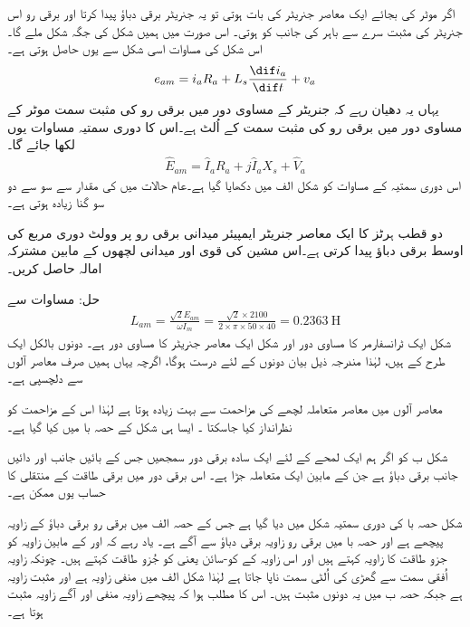اگر موٹر کی بجائے ایک معاصر جنریٹر کی بات ہوتی تو یہ جنریٹر برقی دباؤ پیدا کرتا اور برقی رو اس جنریٹر کی مثبت سرے سے باہر کی جانب کو ہوتی۔ اس صورت میں ہمیں شکل  کی جگہ شکل  ملے گا۔اس شکل کی مساوات اسی شکل سے یوں حاصل ہوتی ہے۔
\begin{align}
e_{am}=i_a R_a+L_s \frac{\dif i_a}{\dif t}+v_a
\end{align}
یہاں یہ دھیان رہے کہ جنریٹر کے مساوی دور میں برقی رو کی مثبت سمت موٹر کے مساوی دور میں برقی رو کی مثبت سمت کے اُلٹ ہے۔اس کا دوری سمتیہ مساوات یوں لکھا جائے گا۔
\begin{align}
\hat{E}_{am}= \hat{I}_a R_a+j \hat{I}_a X_s +\hat{V}_a
\end{align}
اس دوری سمتیہ کے مساوات کو شکل  الف میں دکھایا گیا ہے۔عام حالات میں  کی مقدار   سے سو سے دو سو گنا زیادہ ہوتی ہے۔ 

دو قطب  ہرٹز کا ایک معاصر جنریٹر  ایمپیئر میدانی برقی رو پر   وولٹ دوری مربع کی اوسط برقی دباؤ پیدا کرتی ہے۔اس مشین کی قوی اور میدانی لچھوں کے مابین مشترکہ امالہ حاصل کریں۔

	حل:
	مساوات  سے 
\begin{align}
L_{am}=\frac{\sqrt{2} E_{am}}{\omega I_m}=\frac{\sqrt{2}  \times 2100}{2 \times \pi \times 50 \times 40}=\SI{0.2363}{\henry}
\end{align}
%
شکل   ایک ٹرانسفارمر کا مساوی دور اور شکل  ایک معاصر جنریٹر کا مساوی دور ہے۔ دونوں بالکل ایک طرح کے ہیں، لہٰذا مندرجہ ذیل بیان دونوں کے لئے درست ہوگا، اگرچہ یہاں ہمیں صرف معاصر آلوں سے دلچسپی ہے۔

معاصر آلوں میں معاصر متعاملہ لچھے کی مزاحمت سے بہت زیادہ ہوتا ہے لہٰذا اس کے مزاحمت کو نظرانداز کیا جاسکتا ۔ ایسا ہی شکل کے حصہ با میں کیا گیا ہے۔

شکل  ب کو اگر ہم ایک لمحے کے لئے ایک سادہ برقی دور سمجھیں جس کے بائیں جانب  اور دائیں جانب  برقی دباؤ ہے جن کے مابین ایک متعاملہ  جڑا ہے۔ اس برقی دور میں برقی طاقت کے منتقلی کا حساب یوں ممکن ہے۔

 شکل  حصہ با کی دوری سمتیہ شکل  میں دیا گیا ہے جس کے حصہ الف میں  برقی رو  برقی دباؤ  کے  زاویہ   پیچھے ہے اور حصہ با میں برقی رو  زاویہ برقی دباؤ سے  آگے ہے۔ یاد رہے کہ  اور  کے مابین زاویہ  کو جزو طاقت کا زاویہ کہتے ہیں اور اس زاویہ کے کو-سائن یعنی   کو  جُزو طاقت کہتے ہیں۔ چونکہ زاویہ اُفقی سمت سے گھڑی کی اُلٹی سمت ناپا جاتا ہے لہٰذا شکل الف میں  منفی زاویہ ہے اور  مثبت زاویہ ہے جبکہ حصہ ب میں یہ دونوں مثبت ہیں۔ اس کا مطلب ہوا کہ  پیچھے زاویہ منفی اور آگے زاویہ مثبت ہوتا ہے۔

